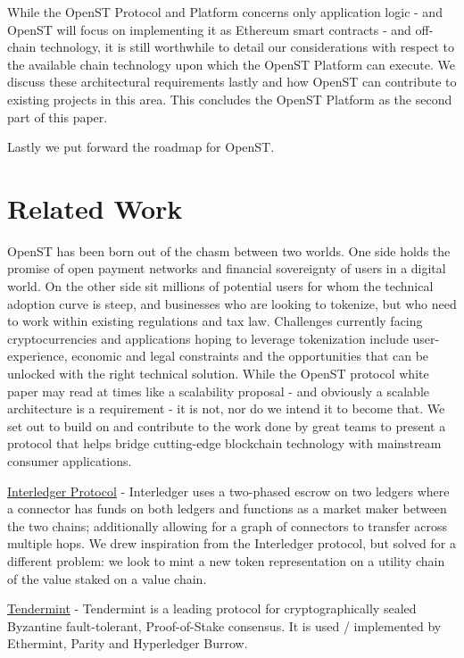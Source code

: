 \documentclass[12pt,a4paper, twocolumn]{article}
\begin{document}
While the OpenST Protocol and Platform concerns only application logic - and OpenST will focus on implementing it as Ethereum smart contracts - and off-chain technology, it is still worthwhile to detail our considerations with respect to the available chain technology upon which the OpenST Platform can execute.  We discuss these architectural requirements lastly and how OpenST can contribute to existing projects in this area. This concludes the OpenST Platform as the second part of this paper.\par
Lastly we put forward the roadmap for OpenST.\par

\section{Related Work}
OpenST has been born out of the chasm between two worlds.  One side holds the promise of open payment networks and financial sovereignty of users in a digital world.  On the other side sit millions of potential users for whom the technical adoption curve is steep, and businesses who are looking to tokenize, but who need to work within existing regulations and tax law.  Challenges currently facing cryptocurrencies and applications hoping to leverage tokenization include user-experience, economic and legal constraints and the opportunities that can be unlocked with the right technical solution.
While the OpenST protocol white paper may read at times like a scalability proposal - and obviously a scalable architecture is a requirement - it is not, nor do we intend it to become that.  We set out to build on and contribute to the work done by great teams to present a protocol that helps bridge cutting-edge blockchain technology with mainstream consumer applications. \par
\href{https://interledger.org/}{Interledger Protocol} - Interledger uses a two-phased escrow on two ledgers where a connector has funds on both ledgers and functions as a market maker between the two chains; additionally allowing for a graph of connectors to transfer across multiple hops.  We drew inspiration from the Interledger protocol, but solved for a different problem: we look to mint a new token representation on a utility chain of the value staked on a value chain. \par
\href{https://tendermint.com/}{Tendermint} - Tendermint is a leading protocol for cryptographically sealed Byzantine fault-tolerant, Proof-of-Stake consensus.  It is used / implemented by Ethermint, Parity and Hyperledger Burrow.\par
\end{document}
